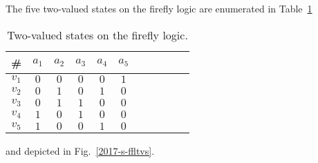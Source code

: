 \documentclass[%
  twocolumn,
 showpacs,
 showkeys,
 preprintnumbers,
 amsmath,amssymb,
 aps,
  pra,
  longbibliography,
 floatfix,
 ]{revtex4-1}
\begin{document}
The five two-valued states on the firefly logic are enumerated in Table~\ref{2017-b-t-fireflytvs}
 \begin{table}%
 \begin{center}
 \caption{\label{2017-b-t-fireflytvs}  Two-valued states on the firefly logic.}
 \begin{ruledtabular}
 \begin{tabular}{ccccccccccc}
 \#     &$a_1$&$a_2$&$a_3$&$a_4$&$a_5$\\
\hline
$v_1$&$0$&$0$&$0$&$0$&$1$  \\
$v_2$&$0$&$1$&$0$&$1$&$0$  \\
$v_3$&$0$&$1$&$1$&$0$&$0$  \\
$v_4$&$1$&$0$&$1$&$0$&$0$  \\
$v_5$&$1$&$0$&$0$&$1$&$0$
 \end{tabular}
 \end{ruledtabular}
 \end{center}
 \end{table}
and depicted in Fig.~\ref{2017-s-ffltvs}.
\end{document}
